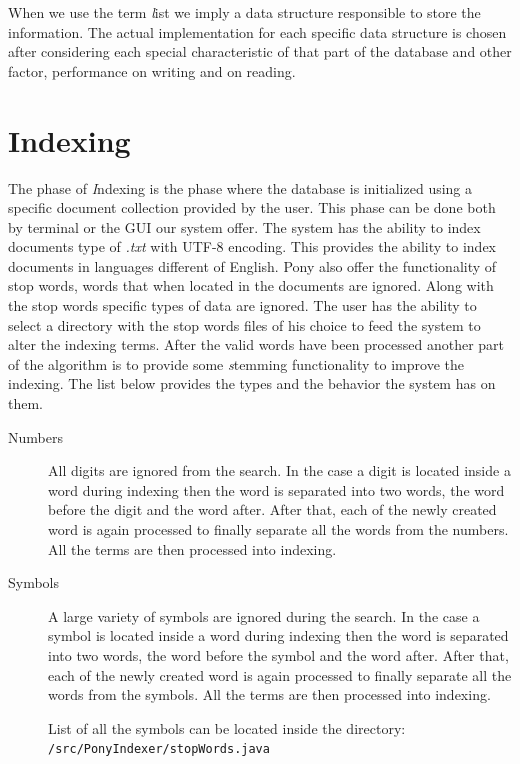 \documentclass[letterpaper,twocolumn,10pt]{article}
\begin{document}
When we use the term {\emph list} we imply a data structure responsible to store the information. The actual implementation for each specific data structure is chosen after considering each special characteristic of that part of the database and other factor, performance on writing and on reading.

\section{Indexing}
The phase of {\emph Indexing} is the phase where the database is initialized using a specific document collection provided by the user. This phase can be done both by terminal or the GUI our system offer. The system has the ability to index documents type of {\it .txt} with UTF-8 encoding. This provides the ability to index documents in languages different of English. Pony also offer the functionality of stop words, words that when located in the documents are ignored. Along with the stop words specific types of data are ignored. The user has the ability to select a directory with the stop words files of his choice to feed the system to alter the indexing terms. After the valid words have been processed another part of the algorithm is to provide some {\emph stemming} functionality to improve the indexing. The list below provides the types and the behavior the system has on them.

\begin{description}
  \item[Numbers] All digits are ignored from the search. In the case a digit is located inside a word during indexing then the word is separated into two words, the word before the digit and the word after. After that, each of the newly created word is again processed to finally separate all the words from the numbers. All the terms are then processed into indexing.
  \item[Symbols] A large variety of symbols are ignored during the search. In the case a symbol is located inside a word during indexing then the word is separated into two words, the word before the symbol and the word after. After that, each of the newly created word is again processed to finally separate all the words from the symbols. All the terms are then processed into indexing.

  List of all the symbols can be located inside the directory: {\tt /src/PonyIndexer/stopWords.java}
\end{description}
\end{document}
